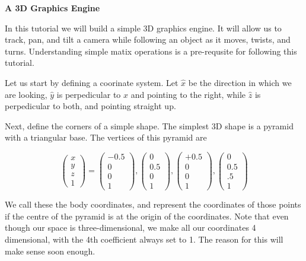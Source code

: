 \documentclass[12pt]{article}
\begin{document}
\begin{center}
{\Large {\bf A 3D Graphics Engine}}
\end{center}

\setlength{\parskip}{1.5ex plus0.5ex minus0.2ex}

In this tutorial we will build a simple 3D graphics engine. It will allow us to track, pan, and tilt a camera while following an object as it moves, twists, and turns. Understanding simple matix operations is a pre-requsite for following this tutorial.

Let us start by defining a coorinate system. Let $\hat{x}$ be the direction in which we are looking, $\hat{y}$ is perpedicular to $\hat{x}$ and pointing to the right, while $\hat{z}$
is perpedicular to both, and pointing straight up.


Next, define the corners of a simple shape. The simplest 3D shape is a pyramid with a triangular base. The vertices of this pyramid are 

$$
\begin{pmatrix}x \\ y \\ z \\ 1 \end{pmatrix} = 
\begin{pmatrix}-0.5 \\ 0 \\ 0 \\ 1 \end{pmatrix},
\begin{pmatrix}0 \\ 0.5 \\ 0 \\ 1 \end{pmatrix},
\begin{pmatrix}+0.5 \\ 0 \\ 0 \\ 1 \end{pmatrix},
\begin{pmatrix}0 \\ 0.5 \\ .5 \\ 1 \end{pmatrix}
$$


We call these the body coordinates, and represent the coordinates of those points if the centre of the pyramid is at the origin of the coordinates. Note that even though our space is three-dimensional, we make all our coordinates 4 dimensional, with the 4th coefficient always set to 1. The reason for this will make sense soon enough.
\end{document}
